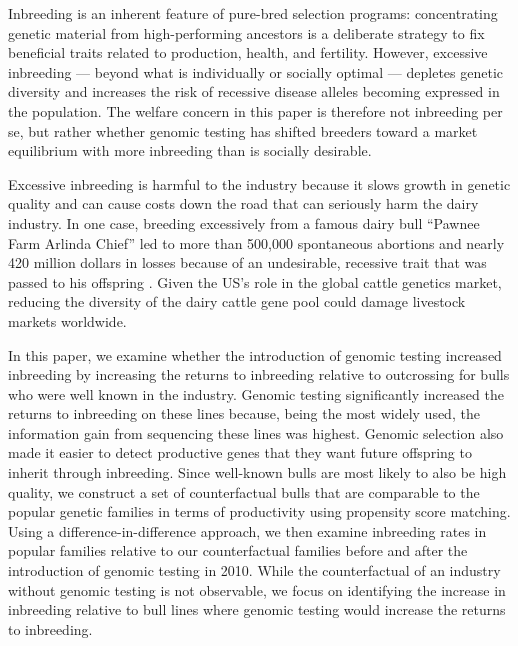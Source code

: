 \documentclass[12pt,letterpaper]{article}
\begin{document}
Inbreeding is an inherent feature of pure-bred selection programs: concentrating genetic material from high-performing ancestors is a deliberate strategy to fix beneficial traits related to production, health, and fertility. However, excessive inbreeding — beyond what is individually or socially optimal — depletes genetic diversity and increases the risk of recessive disease alleles becoming expressed in the population. The welfare concern in this paper is therefore not inbreeding per se, but rather whether genomic testing has shifted breeders toward a market equilibrium with more inbreeding than is socially desirable.

Excessive inbreeding is harmful to the industry because it slows growth in genetic quality and can cause costs down the road that can seriously harm the dairy industry.
In one case, breeding excessively from a famous dairy bull ``Pawnee Farm Arlinda Chief'' led to more than 500,000 spontaneous abortions and nearly 420 million dollars in losses because of an undesirable, recessive trait that was passed to his offspring \citep{Adams2016}. 
Given the US's role in the global cattle genetics market, reducing the diversity of the dairy cattle gene pool could damage livestock markets worldwide.

In this paper, we examine whether the introduction of genomic testing increased inbreeding by increasing the returns to inbreeding relative to outcrossing for bulls who were well known in the industry.
Genomic testing significantly increased the returns to inbreeding on these lines because, being the most widely used, the information gain from sequencing these lines was highest.
Genomic selection also made it easier to detect productive genes that they want future offspring to inherit through inbreeding.
Since well-known bulls are most likely to also be high quality, we construct a set of counterfactual bulls that are comparable to the popular genetic families in terms of productivity using propensity score matching.
Using a difference-in-difference approach, we then examine inbreeding rates in popular families relative to our counterfactual families before and after the introduction of genomic testing in 2010.
While the counterfactual of an industry without genomic testing is not observable, we focus on identifying the increase in inbreeding relative to bull lines where genomic testing would increase the returns to inbreeding.
\end{document}
